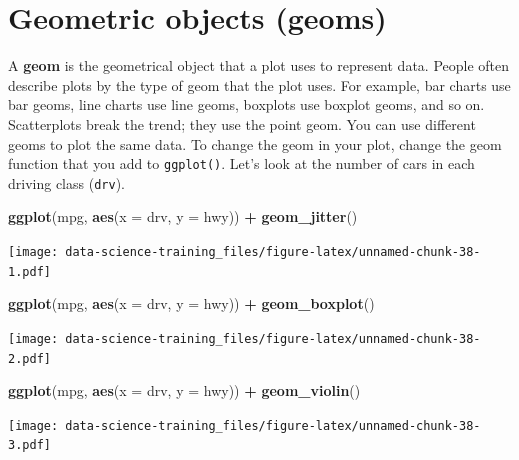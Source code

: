 \documentclass[]{book}
\newenvironment{Shaded}{\begin{snugshade}}{\end{snugshade}}
\newcommand{\KeywordTok}[1]{\textcolor[rgb]{0.13,0.29,0.53}{\textbf{#1}}}
\newcommand{\DataTypeTok}[1]{\textcolor[rgb]{0.13,0.29,0.53}{#1}}
\newcommand{\StringTok}[1]{\textcolor[rgb]{0.31,0.60,0.02}{#1}}
\newcommand{\OperatorTok}[1]{\textcolor[rgb]{0.81,0.36,0.00}{\textbf{#1}}}
\newcommand{\NormalTok}[1]{#1}
\theoremstyle{definition}
\theoremstyle{definition}
\theoremstyle{definition}
\theoremstyle{remark}
\begin{document}
\section{Geometric objects (geoms)}\label{geometric-objects-geoms}

A \textbf{geom} is the geometrical object that a plot uses to represent
data. People often describe plots by the type of geom that the plot
uses. For example, bar charts use bar geoms, line charts use line geoms,
boxplots use boxplot geoms, and so on. Scatterplots break the trend;
they use the point geom. You can use different geoms to plot the same
data. To change the geom in your plot, change the geom function that you
add to \texttt{ggplot()}. Let's look at the number of cars in each
driving class (\texttt{drv}).

\begin{Shaded}
\begin{Highlighting}[]
\KeywordTok{ggplot}\NormalTok{(mpg, }\KeywordTok{aes}\NormalTok{(}\DataTypeTok{x =}\NormalTok{ drv, }\DataTypeTok{y =}\NormalTok{ hwy)) }\OperatorTok{+}\StringTok{ }
\StringTok{  }\KeywordTok{geom_jitter}\NormalTok{()}
\end{Highlighting}
\end{Shaded}

\texttt{[image: data-science-training\_files/figure-latex/unnamed-chunk-38-1.pdf]}

\begin{Shaded}
\begin{Highlighting}[]
\KeywordTok{ggplot}\NormalTok{(mpg, }\KeywordTok{aes}\NormalTok{(}\DataTypeTok{x =}\NormalTok{ drv, }\DataTypeTok{y =}\NormalTok{ hwy)) }\OperatorTok{+}\StringTok{ }
\StringTok{  }\KeywordTok{geom_boxplot}\NormalTok{()}
\end{Highlighting}
\end{Shaded}

\texttt{[image: data-science-training\_files/figure-latex/unnamed-chunk-38-2.pdf]}

\begin{Shaded}
\begin{Highlighting}[]
\KeywordTok{ggplot}\NormalTok{(mpg, }\KeywordTok{aes}\NormalTok{(}\DataTypeTok{x =}\NormalTok{ drv, }\DataTypeTok{y =}\NormalTok{ hwy)) }\OperatorTok{+}\StringTok{ }
\StringTok{  }\KeywordTok{geom_violin}\NormalTok{()}
\end{Highlighting}
\end{Shaded}

\texttt{[image: data-science-training\_files/figure-latex/unnamed-chunk-38-3.pdf]}
\end{document}
